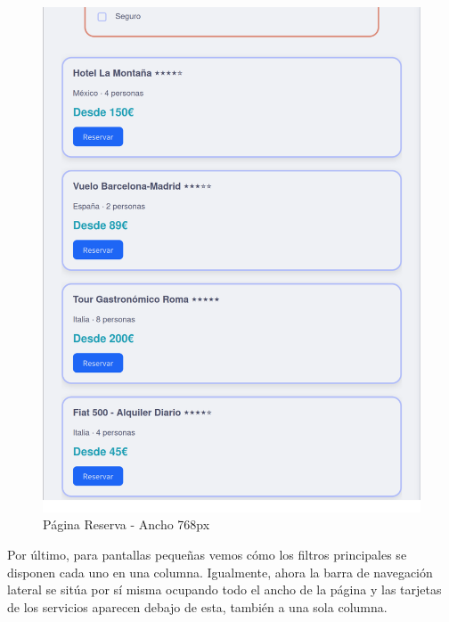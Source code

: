 \documentclass[11pt, a4paper]{book}
\begin{document}
	\begin{figure} [H]
		\centering
		\includegraphics[height=0.4\textheight]{CSS/5-6 768.png}
		\caption{Página Reserva - Ancho 768px}
	\end{figure}

	Por último, para pantallas pequeñas vemos cómo los filtros principales se disponen cada uno en una columna. Igualmente, ahora la barra de navegación lateral se sitúa por sí misma ocupando todo el ancho de la página y las tarjetas de los servicios aparecen debajo de esta, también a una sola columna.
\end{document}
